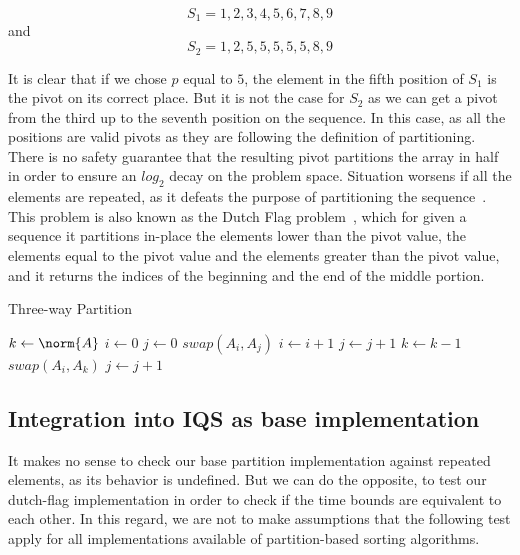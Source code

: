 $$ S_1={1,2,3,4,5,6,7,8,9} $$
and
$$S_2={1,2,5,5,5,5,5,8,9}$$

It is clear that if we chose $p$ equal to $5$, the element in the fifth position of $S_1$ is the pivot on its correct place. But it is not the case for $S_2$ as we can get a pivot from the third up to the seventh position on the sequence. In this case, as all the positions are valid pivots as they are following the definition of partitioning. There is no safety guarantee that the resulting pivot  partitions the array in half in order to ensure an $log_2$ decay on the problem space. Situation worsens if all the elements are repeated, as it defeats the purpose of partitioning the sequence~\cite{7416566}.\\

This problem is also known as the Dutch Flag problem~\cite{10.5555/550359}, which for given a sequence it partitions in-place the elements lower than the pivot value, the elements equal to the pivot value and the elements greater than the pivot value, and it returns the indices of the beginning and the end of the middle portion.\\

\begin{algorithm}
\caption{Three-way Partition}\label{ALG:DUTCH_FLAG_PARTITION}
\begin{algorithmic}[1]
    \State $k \gets \norm{A}$
    \State $i \gets 0$
    \State $j \gets 0$
            \State $swap(A_i, A_j)$
            \State $i \gets i+1$
            \State $j \gets j+1$
            \State $k \gets k-1$
            \State $swap(A_i, A_k)$
        \Else
            \State $j \gets j+1$
        \EndIf
    \EndWhile
    \EndProcedure
\end{algorithmic}
\end{algorithm}

\subsection{Integration into IQS as base implementation}

It makes no sense to check our base partition implementation against repeated elements, as its behavior is undefined. But we can do the opposite, to test our dutch-flag implementation in order to check if the time bounds are equivalent to each other. In this regard, we are not to make assumptions that the following test apply for all implementations available of partition-based sorting algorithms.\\


